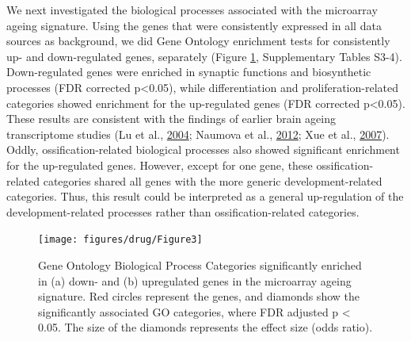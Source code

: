 \documentclass[12pt,twoside]{unicam}
\begin{document}
We next investigated the biological processes associated with the microarray ageing signature. Using the genes that were consistently expressed in all data sources as background, we did Gene Ontology enrichment tests for consistently up- and down-regulated genes, separately (Figure \ref{fig:drugFig3}, Supplementary Tables S3-4). Down-regulated genes were enriched in synaptic functions and biosynthetic processes (FDR corrected p\textless0.05), while differentiation and proliferation-related categories showed enrichment for the up-regulated genes (FDR corrected p\textless0.05). These results are consistent with the findings of earlier brain ageing transcriptome studies (Lu et al., \protect\hyperlink{ref-Lu2004}{2004}; Naumova et al., \protect\hyperlink{ref-Naumova2012}{2012}; Xue et al., \protect\hyperlink{ref-Xue2007}{2007}). Oddly, ossification-related biological processes also showed significant enrichment for the up-regulated genes. However, except for one gene, these ossification-related categories shared all genes with the more generic development-related categories. Thus, this result could be interpreted as a general up-regulation of the development-related processes rather than ossification-related categories.

\begin{figure}

{\centering \texttt{[image: figures/drug/Figure3]} 

}

\caption[GO Enrichment results for the ageing signature]{Gene Ontology Biological Process Categories significantly enriched in (a) down- and (b) upregulated genes in the microarray ageing signature. Red circles represent the genes, and diamonds show the significantly associated GO categories, where FDR adjusted p < 0.05. The size of the diamonds represents the effect size (odds ratio).}\label{fig:drugFig3}
\end{figure}
\end{document}
